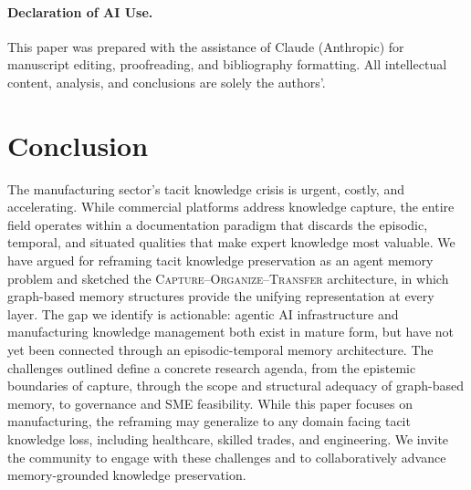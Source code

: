 \documentclass[]{ceurart}
\begin{document}
\paragraph{Declaration of AI Use.}
This paper was prepared with the assistance of Claude (Anthropic) for
manuscript editing, proofreading, and bibliography formatting. All
intellectual content, analysis, and conclusions are solely the authors'.

\section{Conclusion}\label{sec:conclusion}

The manufacturing sector's tacit knowledge crisis is urgent, costly,
and accelerating. While commercial platforms address knowledge
capture, the entire field operates within a documentation
paradigm that discards the episodic, temporal, and situated qualities
that make expert knowledge most valuable. We have argued for reframing
tacit knowledge preservation as an agent memory problem and sketched the
\textsc{Capture--Organize--Transfer} architecture, in which graph-based
memory structures provide the unifying representation at every layer.
The gap we identify is actionable: agentic AI infrastructure and
manufacturing knowledge management both exist in mature form, but have
not yet been connected through an episodic-temporal memory architecture.
The challenges outlined define a concrete
research agenda, from the epistemic boundaries of capture, through
the scope and structural adequacy of graph-based memory, to governance
and SME feasibility. While this paper focuses on manufacturing, the
reframing may generalize to any domain facing tacit knowledge loss,
including healthcare, skilled trades, and engineering. We invite the
community to engage with these challenges and to collaboratively
advance memory-grounded knowledge preservation.

\end{document}
